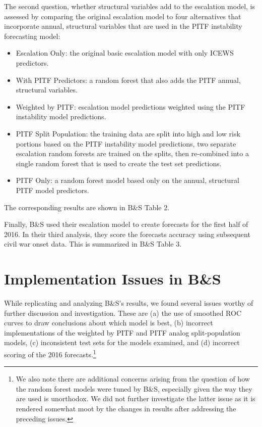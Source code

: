 \documentclass[
]{article}
\providecommand{\tightlist}{%
  \setlength{\itemsep}{0pt}\setlength{\parskip}{0pt}}
\begin{document}
The second question, whether structural variables add to the escalation model, is assessed by comparing the original escalation model to four alternatives that incorporate annual, structural variables that are used in the PITF instability forecasting model:

\begin{itemize}
\tightlist
\item
  Escalation Only: the original basic escalation model with only ICEWS predictors.
\item
  With PITF Predictors: a random forest that also adds the PITF annual, structural variables.
\item
  Weighted by PITF: escalation model predictions weighted using the PITF instability model predictions.
\item
  PITF Split Population: the training data are split into high and low risk portions based on the PITF instability model predictions, two separate escalation random forests are trained on the splits, then re-combined into a single random forest that is used to create the test set predictions.
\item
  PITF Only: a random forest model based only on the annual, structural PITF model predictors.
\end{itemize}

The corresponding results are shown in B\&S Table 2.

Finally, B\&S used their escalation model to create forecasts for the first half of 2016. In their third analysis, they score the forecasts accuracy using subsequent civil war onset data. This is summarized in B\&S Table 3.

\hypertarget{implementation-issues-in-bs}{%
\section{Implementation Issues in B\&S}\label{implementation-issues-in-bs}}

While replicating and analyzing B\&S's results, we found several issues worthy of further discussion and investigation. These are (a) the use of smoothed ROC curves to draw conclusions about which model is best, (b) incorrect implementations of the weighted by PITF and PITF analog split-population models, (c) inconsistent test sets for the models examined, and (d) incorrect scoring of the 2016 forecasts.\footnote{We also note there are additional concerns arising from the question of how the random forest models were tuned by B\&S, especially given the way they are used is unorthodox. We did not further investigate the latter issue as it is rendered somewhat moot by the changes in results after addressing the preceding issues.}
\end{document}
